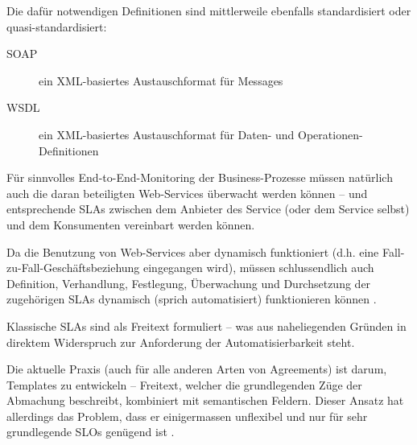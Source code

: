 \documentclass[11pt,listof=totoc]{scrreprt} %
\theoremstyle{definition}
\begin{document}
Die dafür notwendigen Definitionen sind mittlerweile ebenfalls standardisiert oder quasi-standardisiert:
\begin{description}
\item[SOAP] ein XML-basiertes Austauschformat für Messages \cite{wiki:soap}
\item[WSDL] ein XML-basiertes Austauschformat für Daten- und Operationen-Definitionen \cite{wiki:wsdl}
\end{description}

Für sinnvolles End-to-End-Monitoring der Business-Prozesse müssen natürlich auch die daran beteiligten Web-Services überwacht werden können -- und entsprechende SLAs zwischen dem Anbieter des Service (oder dem Service selbst) und dem Konsumenten vereinbart werden können.

Da die Benutzung von Web-Services aber dynamisch funktioniert (d.h. eine Fall-zu-Fall-Geschäftsbeziehung eingegangen wird), müssen schlussendlich auch Definition, Verhandlung, Festlegung, Überwachung und Durchsetzung der zugehörigen SLAs dynamisch (sprich automatisiert) funktionieren können \cite{ibm:wslaPaper}.

Klassische SLAs sind als Freitext formuliert -- was aus naheliegenden Gründen in direktem Widerspruch zur Anforderung der Automatisierbarkeit steht.

Die aktuelle Praxis (auch für alle anderen Arten von Agreements) ist darum, Templates zu entwickeln -- Freitext, welcher die grundlegenden Züge der Abmachung beschreibt, kombiniert mit semantischen Feldern. Dieser Ansatz hat allerdings das Problem, dass er einigermassen unflexibel und nur für sehr grundlegende SLOs genügend ist \cite{ibm:wslaPaper}.
\end{document}
